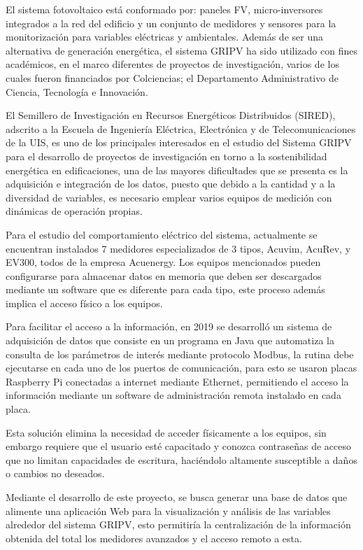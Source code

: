 \documentclass[
11pt, %
codirector, %
]{charter}
\begin{document}
El sistema fotovoltaico está conformado por: paneles FV, micro-inversores integrados a la red del edificio y un conjunto de medidores y sensores para la monitorización para variables eléctricas y ambientales. Además de ser una alternativa de generación energética, el sistema GRIPV ha sido utilizado con fines académicos, en el marco diferentes de proyectos de investigación, varios de los cuales fueron financiados por Colciencias; el Departamento Administrativo de Ciencia, Tecnología e Innovación.

El Semillero de Investigación en Recursos Energéticos Distribuidos (SIRED), adscrito a la Escuela de Ingeniería Eléctrica, Electrónica y de Telecomunicaciones de la UIS, es uno de los principales interesados en el estudio del Sistema GRIPV para el desarrollo de proyectos de investigación en torno a la sostenibilidad energética en edificaciones, una de las mayores dificultades que se presenta es la adquisición e integración de los datos,  puesto que debido a la cantidad y a la diversidad de variables, es necesario emplear varios equipos de medición con dinámicas de operación propias.

Para el estudio del comportamiento eléctrico del sistema, actualmente se encuentran instalados 7 medidores especializados de 3 tipos, Acuvim, AcuRev, y EV300, todos de la empresa Acuenergy. Los equipos mencionados pueden configurarse para almacenar datos en memoria que deben ser descargados mediante un software que es diferente para cada tipo,  este proceso además implica el acceso físico a los equipos.

Para facilitar el acceso a la información, en 2019 se desarrolló un sistema de adquisición de datos que consiste en un programa en Java que automatiza la consulta de los parámetros de interés mediante  protocolo Modbus, la rutina debe ejecutarse en cada uno de los puertos de comunicación, para esto se usaron placas Raspberry Pi conectadas a internet mediante Ethernet, permitiendo el acceso la información mediante un software de administración remota instalado en cada placa.

Esta solución elimina la necesidad de acceder físicamente a los equipos, sin embargo requiere que el usuario esté capacitado y conozca contraseñas de acceso que no limitan capacidades de escritura, haciéndolo altamente susceptible a daños o cambios no deseados.

Mediante el desarrollo de este proyecto, se busca generar una base de datos que alimente una aplicación Web para la visualización y análisis de las variables alrededor del sistema GRIPV, esto permitiría la centralización de la información obtenida del total los medidores avanzados y el acceso remoto a esta.
\end{document}
